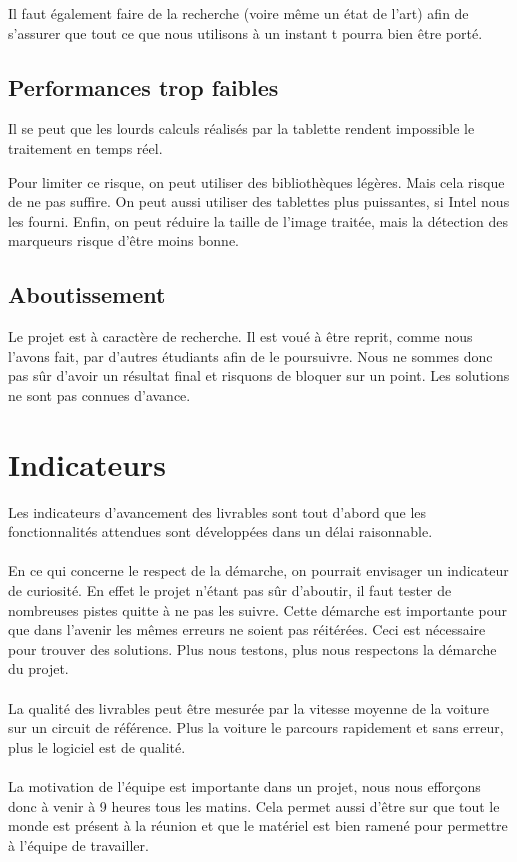 \documentclass[a4paper,12pt]{article}
\begin{document}
Il faut également faire de la recherche (voire même un état de l'art) afin de s'assurer
que tout ce que nous utilisons à un instant t pourra bien être porté.

\subsection{Performances trop faibles}

Il se peut que les lourds calculs réalisés par la tablette rendent impossible
le traitement en temps réel.

Pour limiter ce risque, on peut utiliser des bibliothèques légères. Mais cela
risque de ne pas suffire.
On peut aussi utiliser des tablettes plus puissantes, si Intel nous les fourni.
Enfin, on peut réduire la taille de l'image traitée, mais la détection des
marqueurs risque d'être moins bonne.

\subsection{Aboutissement}

Le projet est à caractère de recherche. Il est voué à être reprit, comme nous l'avons
fait, par d'autres étudiants afin de le poursuivre. Nous ne sommes donc pas sûr d'avoir
un résultat final et risquons de bloquer sur un point. Les solutions ne sont pas connues
d'avance.

\section{Indicateurs}

Les indicateurs d'avancement des livrables sont tout d'abord que les fonctionnalités
attendues sont développées dans un délai raisonnable.

\paragraph{}
En ce qui concerne le respect de la démarche, on pourrait envisager un indicateur de
curiosité. En effet le projet n'étant pas sûr d'aboutir, il faut tester de nombreuses
pistes quitte à ne pas les suivre. Cette démarche est importante pour que dans l'avenir
les mêmes erreurs ne soient pas réitérées.
Ceci est nécessaire pour trouver des solutions. Plus nous testons, plus nous respectons
la démarche du projet.

\paragraph{}
La qualité des livrables peut être mesurée par la vitesse moyenne de la voiture sur un
circuit de référence. Plus la voiture le parcours rapidement et sans erreur, plus le
logiciel est de qualité.

\paragraph{}
La motivation de l'équipe est importante dans un projet, nous nous efforçons donc à venir
à 9 heures tous les matins. Cela permet aussi d'être sur que tout le monde est présent à
la réunion et que le matériel est bien ramené pour permettre à l'équipe de travailler.
\end{document}
